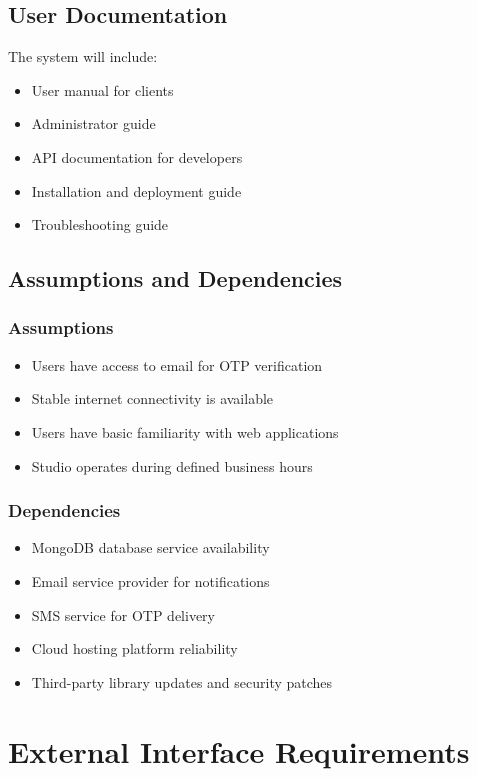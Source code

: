 \documentclass[12pt,a4paper]{article}
\begin{document}
\subsection{User Documentation}
The system will include:
\begin{itemize}
    \item User manual for clients
    \item Administrator guide
    \item API documentation for developers
    \item Installation and deployment guide
    \item Troubleshooting guide
\end{itemize}

\subsection{Assumptions and Dependencies}
\subsubsection{Assumptions}
\begin{itemize}
    \item Users have access to email for OTP verification
    \item Stable internet connectivity is available
    \item Users have basic familiarity with web applications
    \item Studio operates during defined business hours
\end{itemize}

\subsubsection{Dependencies}
\begin{itemize}
    \item MongoDB database service availability
    \item Email service provider for notifications
    \item SMS service for OTP delivery
    \item Cloud hosting platform reliability
    \item Third-party library updates and security patches
\end{itemize}

\section{External Interface Requirements}
\end{document}
